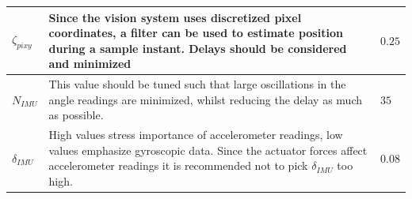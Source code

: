 \begin{table}[H]
\begin{tabular}{p{2.5cm} p{9cm} p{3cm}}
      $\zeta_{pixy}$    &  Since the vision system uses discretized pixel coordinates, a filter can be used to estimate position during a sample instant. Delays should be considered and minimized     & $0.25$   \\ \hline
      $N_{IMU}$    &  This value should be tuned such that large oscillations in the angle readings are minimized, whilst reducing the delay as much as possible. & $35$   \\ \hline
      $\delta_{IMU}$    &  High values stress importance of accelerometer readings, low values emphasize gyroscopic data. Since the actuator forces affect accelerometer readings it is recommended not to pick $\delta_{IMU}$ too high.  & $0.08$  \\ \hline
    \end{tabular}
    \label{tab5:tuningcosiderations}
\end{table}


